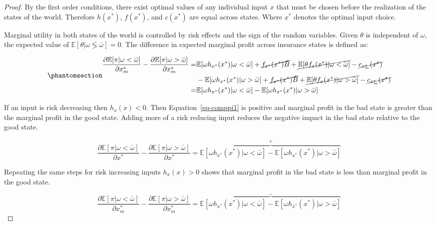 \documentclass[
  letterpaper,
  DIV=11,
  numbers=noendperiod]{scrartcl}
\theoremstyle{plain}
\theoremstyle{plain}
\theoremstyle{remark}
\begin{document}
\begin{proof}
By the first order conditions, there exist optimal values of any
individual input \(x\) that must be chosen before the realization of the
states of the world. Therefore \(h(x^*)\), \(f(x^*)\), and \(c(x^*)\)
are equal across states. Where \(x^*\) denotes the optimal input choice.

Marginal utility in both states of the world is controlled by risk
effects and the sign of the random variables. Given \(\theta\) is
independent of \(\omega\), the expected value of
\(\mathbb{E}[\theta|\omega\lessgtr\bar\omega]=0\). The difference in
expected marginal profit across insurance states is defined as:

\begin{equation}\phantomsection\label{eq-comppi1}{
\begin{aligned}
\small
\frac{\partial \mathbb{E}[\pi|\omega<\bar\omega]}{\partial x^*_m}-\frac{\partial \mathbb{E}[\pi|\omega>\bar\omega]}{\partial x^*_m}=&\mathbb{E}[\omega h_{x^*}(x^*)|\omega<\bar\omega]+\cancel{f_{x^*}(x^*)\hat{B}}+\cancel{\mathbb{E}[\theta f_x(x^*)|\omega <\bar\omega]}-\cancel{c_{x^*_m}(x^*)} \\
&-\mathbb{E}[\omega h_{x^*}(x^*)|\omega>\bar\omega]+\cancel{f_{x^*}(x^*)\hat{B}}+\cancel{\mathbb{E}[\theta f_x(x^*)|\omega >\bar\omega]}-\cancel{c_{x^*_m}(x^*)}\\
=&\mathbb{E}[\omega h_{x^*}(x^*)|\omega<\bar\omega]-\mathbb{E}[\omega h_{x^*}(x^*)|\omega>\bar\omega]
\end{aligned}
}\end{equation}

If an input is risk decreasing then \(h_{x}(x)<0\). Then
Equation~\ref{eq-comppi1} is positive and marginal profit in the bad
state is greater than the marginal profit in the good state. Adding more
of a risk reducing input reduces the negative impact in the bad state
relative to the good state.

\[
\frac{\partial \mathbb{E}[\pi|\omega<\bar\omega]}{\partial x^*}-\frac{\partial \mathbb{E}[\pi|\omega>\bar\omega]}{\partial x^*}=\overbrace{\mathbb{E}[\omega h_{x^*}(x^*)|\omega<\bar\omega]-\mathbb{E}[\omega h_{x^*}(x^*)|\omega>\bar\omega]}^{+}
\]

Repeating the same steps for risk increasing inputs \(h_{x}(x)>0\) shows
that marginal profit in the bad state is less than marginal profit in
the good state.

\[
\frac{\partial \mathbb{E}[\pi|\omega<\bar\omega]}{\partial x^*_m}-\frac{\partial \mathbb{E}[\pi|\omega>\bar\omega]}{\partial x^*_m}=\overbrace{\mathbb{E}[\omega h_{x^*}(x^*)|\omega<\bar\omega]-\mathbb{E}[\omega h_{x^*}(x^*)|\omega>\bar\omega]}^{-}
\]


\end{proof}
\end{document}
